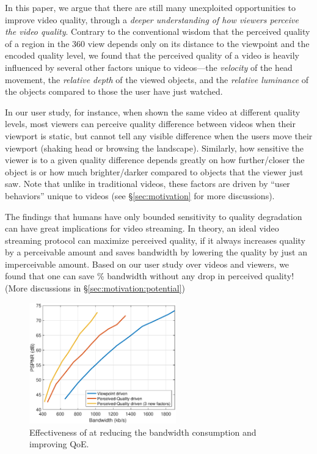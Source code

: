 In this paper, we argue that there are still many unexploited opportunities to improve \vr video quality, through a {\em deeper understanding of how viewers perceive the \vr video quality}.
Contrary to the conventional wisdom that the perceived quality of a region in the 360\textdegree{} view depends only on its distance to the viewpoint and the encoded quality level, we found that the perceived quality of a \vr video is heavily influenced by several other factors unique to \vr videos---the {\em velocity} of the head movement, the {\em relative depth} of the viewed objects, and the {\em relative luminance} of the objects compared to those the user have just watched. 

In our user study, for instance, when shown the same video at different quality levels, most viewers can perceive quality difference between videos when their viewport is static, but cannot tell any visible difference when the users move their viewport (\eg shaking head or browsing the landscape).
Similarly, how sensitive the viewer is to a given quality difference depends greatly on how further/closer the object is or how much brighter/darker compared to objects that the viewer just saw.
Note that unlike in traditional videos, these factors are driven by ``user behaviors'' unique to \vr videos (see \S\ref{sec:motivation} for more discussions).




The findings that humans have only bounded sensitivity to quality degradation can have great implications for \vr video streaming. 
In theory, an ideal video streaming protocol can maximize perceived quality, if it always increases quality by a perceivable amount and saves bandwidth by lowering the quality by just an imperceivable amount. 
Based on our user study over \fillme videos and \fillme viewers, we found that one can save \fillme\% bandwidth without any drop in perceived quality! (More discussions in \S\ref{sec:motivation:potential})



\begin{figure}[t!]
  \centering
  \includegraphics[width=2.5in]{images/improvement.eps}
  \caption{Effectiveness of \name at reducing the bandwidth consumption and improving QoE. }
  \label{fig:intro-improvement}
  \end{figure}

